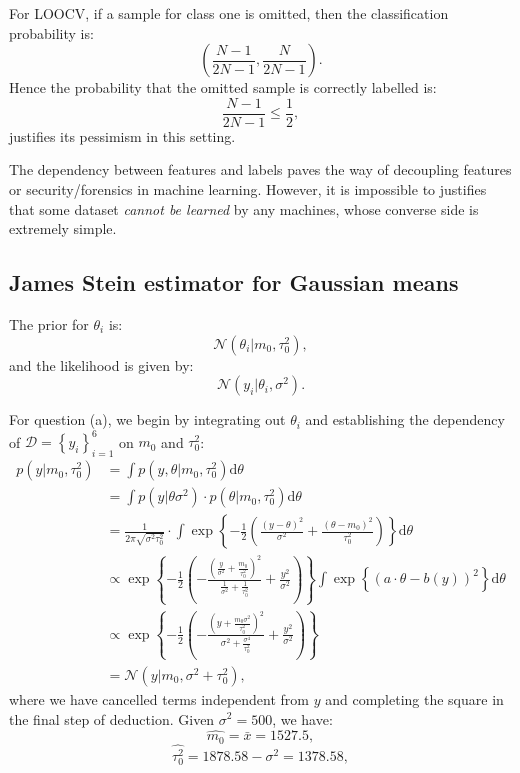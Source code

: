 \documentclass[UTF8]{ctexart}
\begin{document}
For LOOCV, if a sample for class one is omitted, then the classification probability is:
$$(\frac{N-1}{2N-1},\frac{N}{2N-1}).$$
Hence the probability that the omitted sample is correctly labelled is:
$$\frac{N-1}{2N-1}\leq \frac{1}{2},$$
justifies its pessimism in this setting.

The dependency between features and labels paves the way of decoupling features or security/forensics in machine learning.
However, it is impossible to justifies that some dataset \emph{cannot be learned} by any machines, whose converse side is extremely simple.

\subsection{James Stein estimator for Gaussian means}
The prior for $\theta_{i}$ is:
$$\mathcal{N}(\theta_{i}|m_{0},\tau_{0}^{2}),$$
and the likelihood is given by:
$$\mathcal{N}(y_{i}|\theta_{i},\sigma^{2}).$$

For question (a), we begin by integrating out $\theta_{i}$ and establishing the dependency of $\mathcal{D}=\left\{y_{i} \right\}_{i=1}^{6}$ on $m_{0}$ and $\tau_{0}^{2}$:
$$
\begin{aligned}
p(y|m_{0},\tau_{0}^{2})&=\int p(y,\theta|m_{0},\tau_{0}^{2})\text{d}\theta \\
&=\int p(y|\theta\sigma^{2})\cdot p(\theta|m_{0},\tau_{0}^{2})\text{d}\theta \\
&= \frac{1}{2\pi\sqrt{\sigma^{2}\tau_{0}^{2}}}\cdot\int \exp\left\{-\frac{1}{2}\left( \frac{(y-\theta)^{2}}{\sigma^{2}}+\frac{(\theta-m_{0})^{2}}{\tau_{0}^{2}}\right) \right\}\text{d}\theta\\
&\propto\exp\left\{-\frac{1}{2}\left(-\frac{(\frac{y}{\sigma^{2}}+\frac{m_{0}}{\tau_{0}^{2}})^{2}}{\frac{1}{\sigma^{2}}+\frac{1}{\tau_{0}^{2}}}+\frac{y^{2}}{\sigma^{2}}\right) \right\} \int\exp\left\{(a\cdot\theta-b(y))^{2} \right\}\text{d}\theta\\
&\propto \exp\left\{-\frac{1}{2}\left( -\frac{(y+\frac{m_{0}\sigma^{2}}{\tau_{0}^{2}})^{2}}{\sigma^{2}+\frac{\sigma^{4}}{\tau_{0}^{2}}}+\frac{y^{2}}{\sigma^{2}} \right)\right\}\\
&=\mathcal{N}\left(y|m_{0},\sigma^{2}+\tau_{0}^{2}\right),
\end{aligned}
$$
where we have cancelled terms independent from $y$ and completing the square in the final step of deduction.
Given $\sigma^{2}=500$, we have:
$$\hat{m_{0}}=\bar{x}=1527.5,$$
$$\hat{\tau_{0}^{2}}=1878.58-\sigma^{2}=1378.58,$$
\end{document}

